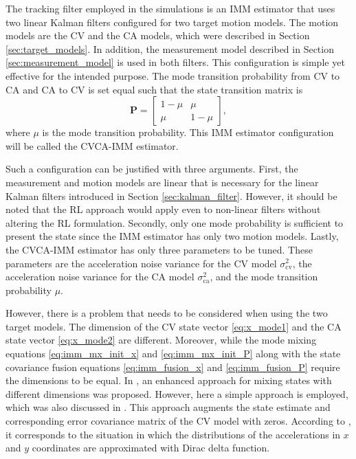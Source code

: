 \documentclass[english, 12pt, a4paper, elec, utf8, a-1b, online]{aaltothesis}
\newcommand{\varcv}{\sigma_\text{cv}^2}
\newcommand{\varca}{\sigma_\text{ca}^2}
\newcommand{\msp}{\mu}
\renewcommand{\vec}[1]{\mathbf{#1}}
\begin{document}
The tracking filter employed in the simulations is an IMM estimator that uses two linear Kalman filters configured for two target motion models.
The motion models are the CV and the CA models, which were described in Section \ref{sec:target_models}.
In addition, the measurement model described in Section \ref{sec:measurement_model} is used in both filters.
This configuration is simple yet effective for the intended purpose.
The mode transition probability from CV to CA and CA to CV is set equal such that the state transition matrix is
\begin{equation}
    \vec{P} = 
\begin{bmatrix}
1 - \msp & \msp\\ 
\msp & 1 - \msp
\end{bmatrix},
\end{equation}
where $\msp$ is the mode transition probability.
This IMM estimator configuration will be called the CVCA-IMM estimator.

Such a configuration can be justified with three arguments.
First, the measurement and motion models are linear that is necessary for the linear Kalman filters introduced in Section \ref{sec:kalman_filter}.
However, it should be noted that the RL approach would apply even to non-linear filters without altering the RL formulation.
Secondly, only one mode probability is sufficient to present the state since the IMM estimator has only two motion models.
Lastly, the CVCA-IMM estimator has only three parameters to be tuned.
These parameters are the acceleration noise variance for the CV model $\varcv$, the acceleration noise variance for the CA model $\varca$, and the mode transition probability $\msp$.

However, there is a problem that needs to be considered when using the two target models.
The dimension of the CV state vector \eqref{eq:x_mode1} and the CA state vector \eqref{eq:x_mode2} are different. 
Moreover, while the mode mixing equations \eqref{eq:imm_mx_init_x} and \eqref{eq:imm_mx_init_P} along with the state covariance fusion equations \eqref{eq:imm_fusion_x} and \eqref{eq:imm_fusion_P} require the dimensions to be equal.
In \cite{Granstroem2015}, an enhanced approach for mixing states with different dimensions was proposed.
However, here a simple approach is employed, which was also discussed in \cite{Granstroem2015}.
This approach augments the state estimate and corresponding error covariance matrix of the CV model with zeros.
According to \cite{Granstroem2015}, it corresponds to the situation in which the distributions of the accelerations in $x$ and $y$ coordinates are approximated with Dirac delta function.
\end{document}
